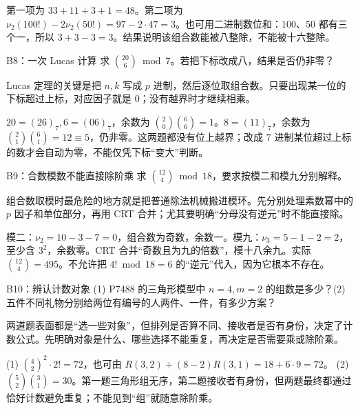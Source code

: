 \sol 第一项为 $33+11+3+1=48$。第二项为 $\nu_2(100!)-2\nu_2(50!)=97-2\cdot47=3$。也可用二进制数位和：$100$、$50$ 都有三个一，所以 $3+3-3=3$。结果说明该组合数能被八整除，不能被十六整除。


\begin{problem}{B8：一次 Lucas 计算}
求 $\binom{20}{6}\bmod7$。若把下标改成八，结果是否仍非零？
\end{problem}

\begin{pitfall}[讲解：先看这题到底在做什么]
Lucas 定理的关键是把 $n,k$ 写成 $p$ 进制，然后逐位取组合数。只要出现某一位的下标超过上标，对应因子就是 $0$；没有越界时才继续相乘。
\end{pitfall}

\sol $20=(26)_7,6=(06)_7$，余数为 $\binom20\binom66=1$。$8=(11)_7$，余数为 $\binom21\binom61=12\equiv5$，仍非零。这两题都没有位上越界；改成 $7$ 进制某位超过上标的数才会自动为零，不能仅凭下标“变大”判断。


\begin{problem}{B9：合数模数不能直接除阶乘}
求 $\binom{12}{4}\bmod18$，要求按模二和模九分别解释。
\end{problem}

\begin{pitfall}[讲解：先看这题到底在做什么]
组合数取模时最危险的地方就是把普通除法机械搬进模环。先分别处理素数幂中的 $p$ 因子和单位部分，再用 CRT 合并；尤其要明确“分母没有逆元”时不能直接除。
\end{pitfall}

\sol 模二：$\nu_2=10-3-7=0$，组合数为奇数，余数一。模九：$\nu_3=5-1-2=2$，至少含 $3^2$，余数零。CRT 合并“奇数且为九的倍数”，模十八余九。实际 $\binom{12}{4}=495$。不允许把 $4!\bmod18=6$ 的“逆元”代入，因为它根本不存在。


\begin{problem}{B10：辨认计数对象}
(1) P7488 的三角形模型中 $n=4,m=2$ 的组数是多少？(2) 五件不同礼物分别给两位有编号的人两件、一件，有多少方案？
\end{problem}

\begin{pitfall}[讲解：先看这题到底在做什么]
两道题表面都是“选一些对象”，但排列是否算不同、接收者是否有身份，决定了计数公式。先明确对象是什么、哪些选择不能重复，再决定是否需要乘或除阶乘。
\end{pitfall}

\sol (1) $\binom42^2\cdot2!=72$，也可由 $R(3,2)+(8-2)R(3,1)=18+6\cdot9=72$。 (2) $\binom52\binom31=30$。第一题三角形组无序，第二题接收者有身份，但两题最终都通过恰好计数避免重复；不能见到“组”就随意除阶乘。


